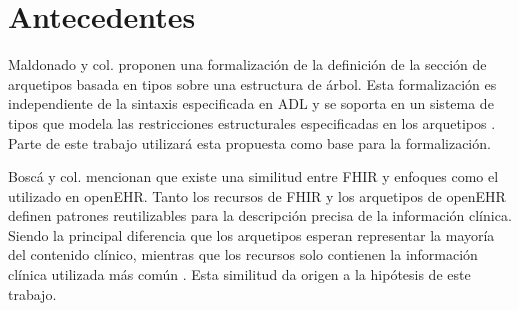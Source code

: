 \section{Antecedentes}

Maldonado y col. proponen una formalización de la definición de la sección de arquetipos basada en tipos sobre una estructura de árbol. Esta formalización es independiente de la sintaxis especificada en ADL y se soporta en un sistema de tipos que modela las restricciones estructurales especificadas en los arquetipos \cite{Maldonado09}. Parte de este trabajo utilizará esta propuesta como base para la formalización.

Boscá y col. mencionan que existe una similitud entre FHIR y enfoques como el utilizado en openEHR. Tanto los recursos de FHIR y los arquetipos de openEHR definen patrones reutilizables para la descripción precisa de la información clínica. Siendo la principal diferencia que los arquetipos esperan representar la mayoría del contenido clínico, mientras que los recursos solo contienen la información clínica utilizada más común \cite{Bosca15}. Esta similitud da origen a la hipótesis de este trabajo.
